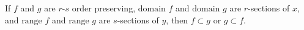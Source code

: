 If $f$ and $g$ are $r$-$s$ order preserving, $\text{domain } f$ and $\text{domain } g$ are $r$-sections of $x$, and $\text{range } f$ and $\text{range } g$ are $s$-sections of $y$, then $f \subset g$ or $g \subset f$.

